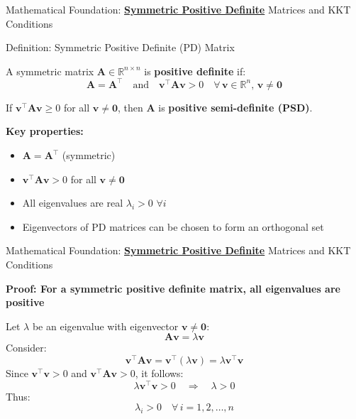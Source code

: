 \documentclass{beamer}
\begin{document}
\begin{frame}{Mathematical Foundation: \textbf{\underline{Symmetric Positive Definite}} Matrices and KKT Conditions}

\begin{block}{Definition: Symmetric Positive Definite (PD) Matrix}

A symmetric matrix $\bm{A} \in \mathbb{R}^{n \times n}$ is \textbf{positive definite} if:
\[
\bm{A} = \bm{A}^\top \quad \text{and} \quad \bm{v}^\top \bm{A} \bm{v} > 0 \quad \forall \, \bm{v} \in \mathbb{R}^n, \, \bm{v} \neq \bm{0}
\]

If $\bm{v}^\top \bm{A} \bm{v} \geq 0$ for all $\bm{v} \neq \bm{0}$, then $\bm{A}$ is \textbf{positive semi-definite (PSD)}.

\vspace{0.3cm}

\textbf{Key properties:}
\begin{itemize}
    \item $\bm{A} = \bm{A}^\top$ (symmetric)
    \item $\bm{v}^\top \bm{A} \bm{v} > 0$ for all $\bm{v} \neq \bm{0}$
    \item All eigenvalues are real $\lambda_i > 0$ $\forall i$
    \item Eigenvectors of PD matrices can be chosen to form an orthogonal set
\end{itemize}

\end{block}

\end{frame}

\begin{frame}{Mathematical Foundation: \textbf{\underline{Symmetric Positive Definite}} Matrices and KKT Conditions}

\textbf{Proof: For a symmetric positive definite matrix, all eigenvalues are positive}

Let $\lambda$ be an eigenvalue with eigenvector $\bm{v} \neq \bm{0}$:
\[
\bm{A} \bm{v} = \lambda \bm{v}
\]
Consider:
\[
\bm{v}^\top \bm{A} \bm{v} = \bm{v}^\top (\lambda \bm{v}) = \lambda \bm{v}^\top \bm{v}
\]
Since $\bm{v}^\top \bm{v} > 0$ and $\bm{v}^\top \bm{A} \bm{v} > 0$, it follows:
\[
\lambda \bm{v}^\top \bm{v} > 0 \quad \Rightarrow \quad \lambda > 0
\]
Thus:
\[
\boxed{\lambda_i > 0 \quad \forall \, i = 1,2,\dots, n}
\]

\end{frame}
\end{document}

